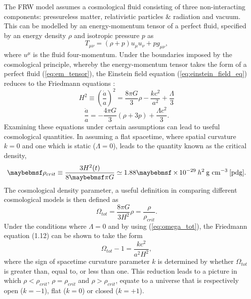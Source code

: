 The FRW model assumes a cosmological fluid consisting of three non-interacting components: pressureless matter, relativistic particles \& radiation and vacuum. This can be modelled by an energy-momentum tensor of a perfect fluid, specified by an energy density $\rho$  and isotropic pressure $p$ as 
%
\begin{equation}\label{eq:em_tensor}
  T_{\mu\nu} = (\rho + p)u_{\mu}u_{\nu} + pg_{\mu\nu}, 
\end{equation}
%
where $u^{\mu}$ is the fluid four-momentum. Under the boundaries imposed by the cosmological principle, whereby the energy-momentum tensor takes the form of a perfect fluid (\ref{eq:em_tensor}), the Einstein field equation (\ref{eq:einstein_field_eq}) reduces to the Friedmann equations \cite{Friedman, SeanC}:
%
\begin{equation}
  H^2 \equiv \left( \frac{\dot{a}}{a} \right)^2 = \frac{8\pi{}G}{3}\rho - \frac{kc^2}{a^2} + \frac{\Lambda}{3}
\end{equation}
%
%
\begin{equation}\label{eq:friedmann_2}
    \frac{\ddot{a}}{a} = -\frac{4\pi{}G}{3}(\rho + 3p) + \frac{\Lambda{}c^2}{3}.
\end{equation}
%
Examining these equations under certain assumptions can lead to useful cosmological quantities. In assuming a flat spacetime, where spatial curvature $k=0$ and one which is static ($\Lambda = 0$), leads to the quantity known as the critical density, 
%
\begin{equation}\label{eq:crit_density}
  \rho_{crit} \equiv \frac{3H^2(t)}{8\pi{}G} \simeq 1.88 \times 10^{-29} \: h^2 \: \MathText{g cm}^{-3} \: \cite{pdg}.
\end{equation}
%
The cosmological density parameter, a useful definition in comparing different cosmological models is then defined as
%
\begin{equation}\label{eq:omega_tot}
  \Omega_{tot} = \frac{8\pi{}G}{3H^2}\rho = \frac{\rho}{\rho_{crit}}.
\end{equation}
%
Under the conditions where $\Lambda = 0$ and by using (\ref{eq:omega_tot}), the Friedmann equation (1.12) can be shown to take the form
%
\begin{equation}\label{eq:density_param}
  \Omega_{tot} - 1 = \frac{kc^2}{a^2H^2}, 
\end{equation}
%
where the sign of spacetime curvature parameter $k$ is determined by whether $\Omega_{tot}$ is greater than, equal to, or less than one. This reduction leads to a picture in which $\rho < \rho_{crit}$, $\rho = \rho_{crit}$ and $\rho > \rho_{crit}$, equate to a universe that is respectively open ($k=-1$), flat ($k=0$) or closed ($k=+1$). 

